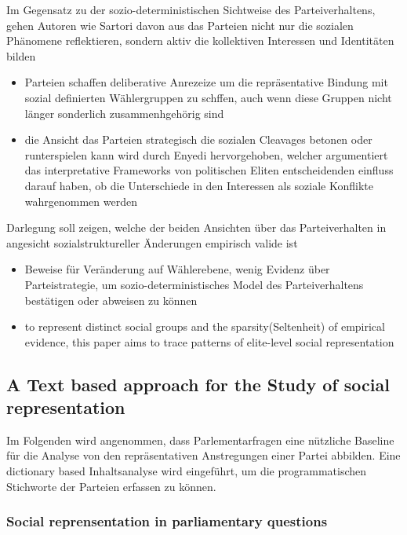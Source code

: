 \documentclass[11pt]{article}
\begin{document}
Im Gegensatz zu der sozio-deterministischen Sichtweise des Parteiverhaltens, gehen Autoren wie Sartori davon aus das Parteien nicht nur die sozialen Phänomene reflektieren, sondern aktiv die kollektiven Interessen und Identitäten bilden 

\begin{itemize}
\item Parteien schaffen deliberative Anrezeize um die repräsentative Bindung mit sozial definierten Wählergruppen zu schffen, auch wenn diese Gruppen nicht länger sonderlich zusammenhgehörig sind
\item die Ansicht das Parteien strategisch die sozialen Cleavages betonen oder runterspielen kann wird durch Enyedi hervorgehoben, welcher argumentiert das interpretative Frameworks von politischen Eliten entscheidenden einfluss darauf haben, ob die Unterschiede in den Interessen als soziale Konflikte wahrgenommen werden
\end{itemize}

Darlegung soll zeigen, welche der beiden Ansichten über das Parteiverhalten in angesicht sozialstruktureller Änderungen empirisch valide ist 

\begin{itemize}
\item Beweise für Veränderung auf Wählerebene, wenig Evidenz über Parteistrategie, um sozio-deterministisches Model des Parteiverhaltens bestätigen oder abweisen zu können
\item to represent distinct social groups and the sparsity(Seltenheit) of empirical evidence, this paper aims to trace patterns of elite-level social representation
\end{itemize}

\subsection{A Text based approach for the Study of social representation}
\label{sec:orgd570289}

Im Folgenden wird angenommen, dass Parlementarfragen eine nützliche Baseline für die Analyse von den repräsentativen Anstregungen einer Partei abbilden. Eine dictionary based Inhaltsanalyse wird eingeführt, um die programmatischen Stichworte der Parteien erfassen zu können. 

\subsubsection{Social reprensentation in parliamentary questions}
\label{sec:org89dc913}
\end{document}
